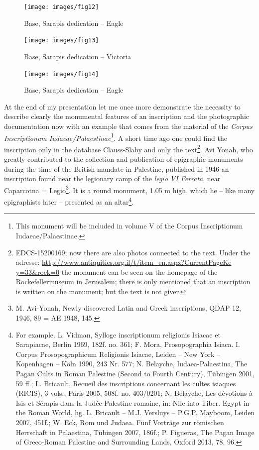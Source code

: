 \documentclass[amsthm,ebook]{saparticle}
\begin{document}
\begin{figure}[!bp]
\centering
 \texttt{[image: images/fig12]}
\caption{Base, Sarapis dedication -- Eagle}
\label{fig:12}
\end{figure}

\begin{figure}[!bp]
\centering
 \texttt{[image: images/fig13]}
\caption{Base, Sarapis dedication -- Victoria}
\label{fig:13}
\end{figure}

\begin{figure}[!bp]
\centering
 \texttt{[image: images/fig14]}
\caption{Base, Sarapis dedication -- Eagle}
\label{fig:14}
\end{figure}

At the end of my presentation let me once more demonstrate the necessity to describe 
clearly the monumental features of an inscription and the photographic documentation 
now with an example that comes from the material of the \textit{Corpus Inscriptionum 
Iudaeae/Palaestinae}\footnote{This monument will be included in volume V of the Corpus Inscriptionum Iudaeae/Palaestinae.}. A short time ago one could find the inscription only in the 
database Clauss-Slaby and only the text\footnote{EDCS-15200169; now there are also photos connected to the text. Under the adresse: \url{http://www.antiquities.org.il/t/item_en.aspx?CurrentPageKe y=33&rock=0} the monument can be seen on the homepage of the Rockefellermuseum in Jerusalem; there is only mentioned that an inscription is written on the monument; but the text is not given}. Avi Yonah, who greatly contributed to 
the collection and publication of epigraphic monuments during the time of the British 
mandate in Palestine, published in 1946 an inscription found near the legionary 
camp of the \textit{legio VI Ferrata}, near Caparcotna = Legio\footnote{M. Avi-Yonah, Newly discovered Latin and Greek inscriptions, QDAP 12, 1946, 89 = AE 1948, 145.}. It is a round monument, 
1.05 m high, which he – like many epigraphists later – presented as an altar\footnote{For example. L. Vidman, Sylloge inscriptionum religionis Isiacae et Sarapiacae, Berlin 1969, 182f. no. 361; F. Mora, Prosopographia Isiaca. I. Corpus Prosopographicum Religionis Isiacae, Leiden – New York – Kopenhagen – Köln 1990, 243 Nr. 577; N. Belayche, Iudaea-Palaestina, The Pagan Cults in Roman Palestine (Second to Fourth Century), Tübingen 2001, 59 ff.; L. Bricault, Recueil des inscriptions concernant les cultes isiaques (RICIS), 3 vols., Paris 2005, 508f. no. 403/0201; N. Belayche, Les dévotions à Isis et Sérapis dans la Judée-Palestine romaine, in: Nile into Tiber. Egypt in the Roman World, hg. L. Bricault – M.J. Versluys – P.G.P. Mayboom, Leiden 2007, 451f.; W. Eck, Rom und Judaea. Fünf Vorträge zur römischen Herrschaft in Palaestina, Tübingen 2007, 186f.; P. Figueras, The Pagan Image of Greco-Roman Palestine and Surrounding Lands, Oxford 2013, 78. 96.}. 
\end{document}
